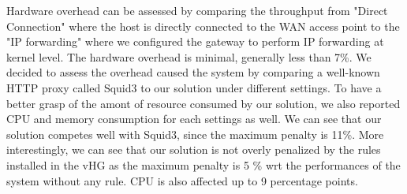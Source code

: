 Hardware overhead can be assessed by comparing the throughput from "Direct Connection" where the host is directly connected to the WAN access point to the "IP forwarding" where we configured the gateway to perform IP forwarding at kernel level. The hardware overhead is minimal, generally less than 7\%.
We decided to assess the overhead caused the system by comparing a well-known HTTP proxy called Squid3 to our solution under different settings. To have a better grasp of the amont of resource consumed by our solution, we also reported CPU and memory consumption for each settings as well.
We can see that our solution competes well with Squid3, since the maximum penalty is 11\%. More interestingly, we can see that our solution is not overly penalized by the rules installed in the vHG as the maximum penalty is 5 \% wrt the performances of the system without any rule. CPU is also affected up to 9 percentage points.





